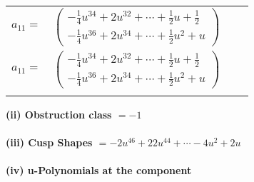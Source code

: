 \documentclass[1p]{elsarticle_modified}
\theoremstyle{definition}
\begin{document}
\begin{tabular}{m{7pt} m{180pt} m{7pt} m{180pt} }
\flushright $a_{11}=$&$\begin{pmatrix}-\frac{1}{4} u^{34}+2 u^{32}+\cdots+\frac{1}{2} u+\frac{1}{2}\\-\frac{1}{4} u^{36}+2 u^{34}+\cdots+\frac{1}{2} u^2+u\end{pmatrix}$\\ \flushright $a_{11}=$&$\begin{pmatrix}-\frac{1}{4} u^{34}+2 u^{32}+\cdots+\frac{1}{2} u+\frac{1}{2}\\-\frac{1}{4} u^{36}+2 u^{34}+\cdots+\frac{1}{2} u^2+u\end{pmatrix}$\\&\end{tabular}
\flushleft \textbf{(ii) Obstruction class $= -1$}\\~\\
\flushleft \textbf{(iii) Cusp Shapes $= -2 u^{46}+22 u^{44}+\cdots-4 u^2+2 u$}\\~\\
\newpage\renewcommand{\arraystretch}{1}
\flushleft \textbf{(iv) u-Polynomials at the component}\newline \\
\end{document}
